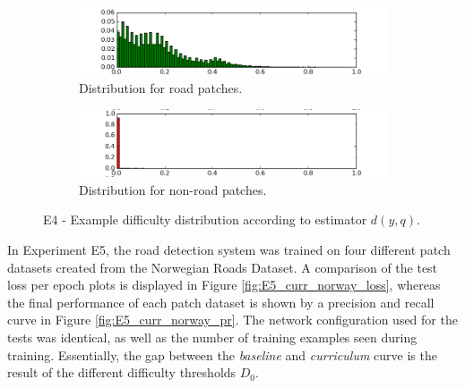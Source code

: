 \begin{figure}
\begin{subfigure}{0.5\textwidth}
\includegraphics[width=\linewidth]{figs/E4/E4-road-dist.png}
\caption{Distribution for road patches.} \label{fig:E4_difficulty_distribution_road}
\end{subfigure}
\hspace*{\fill} %
\begin{subfigure}{0.5\textwidth}
\includegraphics[width=\linewidth]{figs/E4/E4-non_road-dist.png}
\caption{Distribution for non-road patches.} \label{fig:E4_difficulty_distribution_nonroad}
\end{subfigure}
\hspace*{\fill} %
\caption[E4 - Difficulty distribution]{E4 - Example difficulty distribution according to estimator $d(y,q)$. } \label{fig:E4_difficulty_distribution}
\end{figure}

In Experiment E5, the road detection system was trained on four different patch datasets created from the Norwegian Roads Dataset. A comparison of the test loss per epoch plots is displayed in Figure \ref{fig:E5_curr_norway_loss}, whereas the final performance of each patch dataset is shown by a precision and recall curve in Figure \ref{fig:E5_curr_norway_pr}. The network configuration used for the tests was identical, as well as the number of training examples seen during training. Essentially, the gap between the \textit{baseline} and \textit{curriculum} curve is the result of the different difficulty thresholds $D_0$.\\

